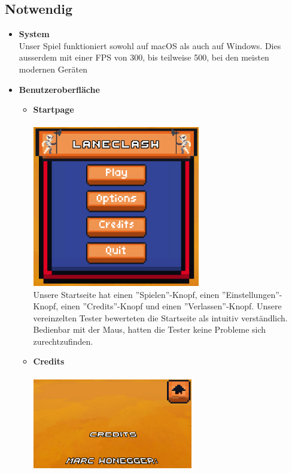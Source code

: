 \subsection*{Notwendig}
\begin{itemize}
    \item \textbf{System} \\
        Unser Spiel funktioniert sowohl auf macOS als auch auf Windows. Dies ausserdem mit einer FPS von 300, bis teilweise 500, bei den meisten modernen Geräten
    \item \textbf{Benutzeroberfläche} \\
    \begin {itemize}
        \item \textbf{Startpage} \\
            \\
            \includegraphics[height=7cm]{resources/laneclash.png}\\
            Unsere Startseite hat einen ''Spielen''-Knopf, einen ''Einstellungen''-Knopf, einen ''Credits''-Knopf und einen ''Verlassen''-Knopf. Unsere vereinzelten Tester bewerteten die Startseite
        als intuitiv verständlich. Bedienbar mit der Maus, hatten die Tester keine Probleme sich zurechtzufinden.
        \item \textbf{Credits}\\
            \\
            \includegraphics*[width = 7cm]{resources/credits.png}\\

\end{itemize}
\end{itemize}
